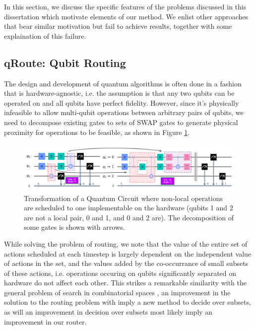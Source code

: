 In this section, we discuss the specific features of the problems discussed in this dissertation which motivate elements of our method. We enlist other approaches that bear similar motivation but fail to achieve results, together with some explaination of this failure.

\subsection{qRoute: Qubit Routing}

The design and development of quantum algorithms is often done in a fashion that is hardware-agnostic, i.e. the assumption is that any two qubits can be operated on and all qubits have perfect fidelity. However, since it's physically infeasible to allow multi-qubit operations between arbitrary pairs of qubits, we need to decompose existing gates to sets of SWAP gates to generate physical proximity for operations to be feasible, as shown in Figure \ref{fig:intro-qubit-routing-example}. 

\begin{figure}[ht]
    \centering
    \includegraphics[width=\linewidth]{figures/intro/routing-transform.png}
    \caption[Example of the Qubit Routing task]{Transformation of a Quantum Circuit where non-local operations are scheduled to one implementable on the hardware (qubits 1 and 2 are not a local pair, 0 and 1, and 0 and 2 are). The decomposition of some gates is shown with arrows.}
    \label{fig:intro-qubit-routing-example}
\end{figure}

While solving the problem of routing, we note that the value of the entire set of actions scheduled at each timestep is largely dependent on the independent value of actions in the set, and the values added by the co-occurrance of small subsets of these actions, i.e. operations occuring on qubits significantly separated on hardware do not affect each other. This strikes a remarkable similarity with the general problem of search in combinatorial spaces \cite{qroute_dqn1}, an improvement in the solution to the routing problem with imply a new method to decide over subsets, as will an improvement in decision over subsets most likely imply an improvement in our router.

